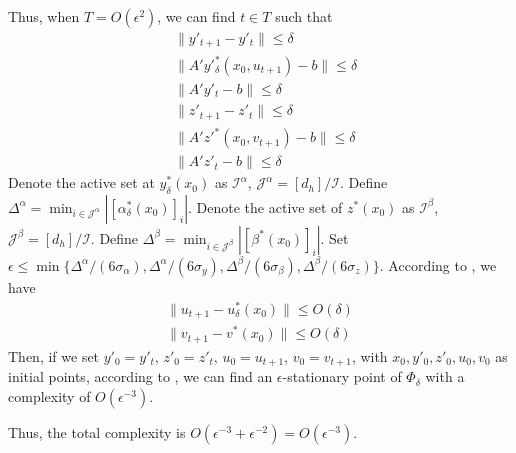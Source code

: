 \documentclass{article}
\newcommand{\Ic}{\mathcal{I}}
\newcommand{\Jc}{\mathcal{J}}
\theoremstyle{plain}
\theoremstyle{definition}
\theoremstyle{remark}
\begin{document}
Thus, when $T=O(\epsilon^2)$, we can find $t\in T$ such that
\begin{align*}
    &\|y'_{t+1}-y'_t\|\leq \delta\\
    &\|A'y'^*_\delta(x_0,u_{t+1})-b\|\leq \delta\\
    &\|A'y'_t-b\|\leq \delta\\
    &\|z'_{t+1}-z'_t\|\leq \delta\\
    &\|A'z'^*(x_0,v_{t+1})-b\|\leq \delta\\
    &\|A'z'_t-b\|\leq \delta
\end{align*}
Denote the active set at $y^*_\delta(x_0)$ as $\Ic^\alpha$, $\Jc^\alpha=[d_h]/\Ic$. Define $\Delta^\alpha=\min_{i\in\Jc^\alpha}|[\alpha^*_\delta(x_0)]_i|$. Denote the active set of $z^*(x_0)$ as $\Ic^\beta$, $\Jc^\beta=[d_h]/\Ic$. Define $\Delta^\beta=\min_{i\in\Jc^\beta}|[\beta^*(x_0)]_i|$. Set $\epsilon\leq \min\{\Delta^\alpha/(6\sigma_{\alpha}), \Delta^\alpha/(6\sigma_y), \Delta^\beta/(6\sigma_{\beta}), \Delta^\beta/(6\sigma_z)\}$. According to , we have
\begin{align*}
    \|u_{t+1}-u^*_\delta(x_0)\|\leq O(\delta)\\
    \|v_{t+1}-v^*(x_0)\|\leq O(\delta)
\end{align*}
Then, if we set $y'_0=y'_t$, $z'_0=z'_t$, $u_0= u_{t+1}$, $v_0=v_{t+1}$, with $x_0, y'_0, z'_0, u_0, v_0$ as initial points, according to , we can find an $\epsilon$-stationary point of $\Phi_\delta$
with a complexity of $O(\epsilon^{-3})$.

Thus, the total complexity is $O(\epsilon^{-3}+\epsilon^{-2})=O(\epsilon^{-3})$.
\end{document}
